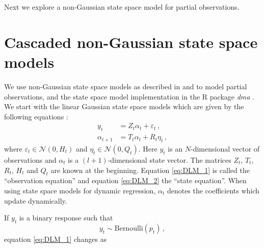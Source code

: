 \documentclass[a4paper,11pt]{article}
\DeclareMathOperator*{\E}{E}
\begin{document}
Next we explore a non-Gaussian state space model for partial observations.

\section{Cascaded non-Gaussian state space models}\label{sec:CascadedDLM}

We use non-Gaussian state space models as described in \cite{durbin1998time} and \cite{mccormick2012dynamic} to model partial observations, and the state space model implementation in the R package \textit{dma} \cite{dma}. We start with the linear Gaussian state space models which are given by the following equations :
\begin{align}
	y_t          & = Z_t \alpha_t + \varepsilon_t \, , \label{eq:DLM_1} \\
	\alpha_{t+1} & = T_t \alpha_t + R_t \eta_t \, , \label{eq:DLM_2}
\end{align}
where $\varepsilon_t \in \mathcal{N} \left(0, H_t\right)$ and $\eta_t \in \mathcal{N} \left(0, Q_t\right)$. %
Here $y_t$ is an $N$-dimensional vector of observations and $\alpha_t$ is a $(l+1)$-dimensional state vector. The matrices $Z_t$, $T_t$, $R_t$, $H_t$ and $Q_t$ are known at the beginning.  Equation \eqref{eq:DLM_1} is called the ``observation equation'' and equation \eqref{eq:DLM_2}  the ``state equation''. When using state space models for dynamic regression, $\alpha_t$ denotes the coefficients which update dynamically.


If $y_t$ is a binary response such that 
$$ y_t \sim \text{Bernoulli}(p_t) \, , $$
equation \eqref{eq:DLM_1} changes as 
\end{document}
